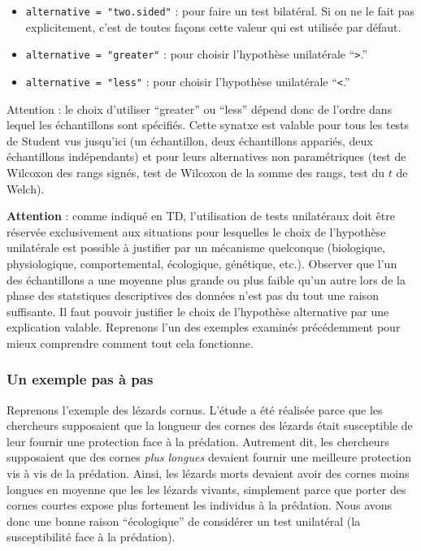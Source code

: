\documentclass[
  a4paper,
]{article}
\providecommand{\tightlist}{%
  \setlength{\itemsep}{0pt}\setlength{\parskip}{0pt}}
\begin{document}
\begin{itemize}
\tightlist
\item
  \texttt{alternative\ =\ "two.sided"} : pour faire un test bilatéral. Si on ne le fait pas explicitement, c'est de toutes façons cette valeur qui est utilisée par défaut.
\item
  \texttt{alternative\ =\ "greater"} : pour choisir l'hypothèse unilatérale ``\texttt{\textgreater{}}.''
\item
  \texttt{alternative\ =\ "less"} : pour choisir l'hypothèse unilatérale ``\texttt{\textless{}}.''
\end{itemize}

Attention : le choix d'utiliser ``greater'' ou ``less'' dépend donc de l'ordre dans lequel les échantillons sont spécifiés. Cette synatxe est valable pour tous les tests de Student vus jusqu'ici (un échantillon, deux échantillons appariés, deux échantillons indépendants) et pour leurs alternatives non paramétriques (test de Wilcoxon des rangs signés, test de Wilcoxon de la somme des rangs, test du \(t\) de Welch).

\textbf{Attention} : comme indiqué en TD, l'utilisation de tests unilatéraux doit être réservée exclusivement aux situations pour lesquelles le choix de l'hypothèse unilatérale est possible à justifier par un mécanisme quelconque (biologique, physiologique, comportemental, écologique, génétique, etc.). Observer que l'un des échantillons a une moyenne plus grande ou plus faible qu'un autre lors de la phase des statstiques descriptives des données n'est pas du tout une raison suffisante. Il faut pouvoir justifier le choix de l'hypothèse alternative par une explication valable. Reprenons l'un des exemples examinés précédemment pour mieux comprendre comment tout cela fonctionne.

\hypertarget{un-exemple-pas-uxe0-pas}{%
\subsubsection{Un exemple pas à pas}\label{un-exemple-pas-uxe0-pas}}

Reprenons l'exemple des lézards cornus. L'étude a été réalisée parce que les chercheurs supposaient que la longueur des cornes des lézards était susceptible de leur fournir une protection face à la prédation. Autrement dit, les chercheurs supposaient que des cornes \emph{plus longues} devaient fournir une meilleure protection vis à vis de la prédation. Ainsi, les lézards morts devaient avoir des cornes moins longues en moyenne que les les lézards vivants, simplement parce que porter des cornes courtes expose plus fortement les individus à la prédation. Nous avons donc une bonne raison ``écologique'' de considérer un test unilatéral (la susceptibilité face à la prédation).
\end{document}
